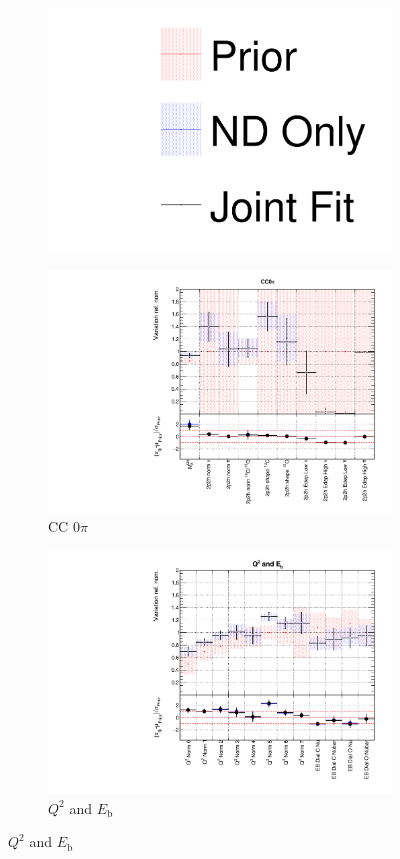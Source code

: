 \begin{figure}[!htbp]
\centering
\begin{subfigure}{0.8\textwidth}
  \centering
  \includegraphics[width=0.24\linewidth]{figs/joint_leg}
\end{subfigure}
\begin{subfigure}{0.49\textwidth}
  \centering
  \includegraphics[width=0.9\linewidth]{figs/jointxsec1}
  \caption{CC 0$\pi$}
\end{subfigure}
\begin{subfigure}{0.49\textwidth}
  \centering
  \includegraphics[width=0.9\linewidth]{figs/jointxsec2}
  \caption{$Q^2$ and $E_{\mathrm{b}}$}
\end{subfigure}

\end{figure}
